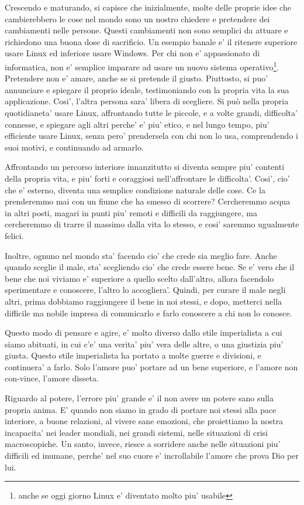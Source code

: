 Crescendo e maturando, si capisce che inizialmente, molte delle proprie idee che cambierebbero le cose nel mondo sono un nostro chiedere e pretendere dei cambiamenti nelle persone. Questi cambiamenti non sono semplici da attuare e richiedono una buona dose di sacrificio. Un esempio banale e' il ritenere superiore usare Linux ed inferiore usare Windows. Per chi non e' appassionato di informatica, non e' semplice imparare ad usare un nuovo sistema operativo\footnote{anche se oggi giorno Linux e' diventato molto piu' usabile}.
Pretendere non e' amare, anche se si pretende il giusto. Piuttosto, si puo' annunciare e spiegare il proprio ideale, testimoniando con la propria vita la sua applicazione. Cosi', l'altra persona sara' libera di scegliere. Si può nella propria quotidianeta' usare Linux, affrontando tutte le piccole, e a volte grandi, difficolta' connesse, e spiegare agli altri perche' e' piu' etico, e nel lungo tempo, piu' efficiente usare Linux, senza pero' prendersela con chi non lo usa, comprendendo i suoi motivi, e continuando ad armarlo.

Affrontando un percorso interiore innanzitutto si diventa sempre piu' contenti della propria vita, e piu' forti e coraggiosi nell'affrontare le difficolta'. Cosi', cio' che e' esterno, diventa una semplice condizione naturale delle cose. Ce la prenderemmo mai con un fiume che ha smesso di scorrere? Cercheremmo acqua in altri posti, magari in punti piu' remoti e difficili da raggiungere, ma cercheremmo di trarre il massimo dalla vita lo stesso, e cosi' saremmo ugualmente felici. 

Inoltre, ognuno nel mondo sta' facendo cio' che crede sia meglio fare. Anche quando sceglie il male, sta' scegliendo cio' che crede essere bene. Se e' vero che il bene che noi viviamo e' superiore a quello scelto dall'altro, allora facendolo sperimentare e conoscere, l'altro lo accogliera'.
Quindi, per curare il male negli altri, prima dobbiamo raggiungere il bene in noi stessi, e dopo, metterci nella difficile ma nobile impresa di comunicarlo e farlo conoscere a chi non lo conosce.

Questo modo di pensare e agire, e' molto diverso dallo stile imperialista a cui siamo abituati, in cui c'e' una verita' piu' vera delle altre, o una giustizia piu' giusta. Questo stile imperialista ha portato a molte guerre e divisioni, e continuera' a farlo. Solo l'amore puo' portare ad un bene superiore, e l'amore non con-vince, l'amore disseta.

Riguardo al potere, l'errore piu' grande e' il non avere un potere sano sulla propria anima. E' quando non siamo in grado di portare noi stessi alla pace interiore, a buone relazioni, al vivere sane emozioni, che proiettiamo la nostra incapacita' nei leader mondiali, nei grandi sistemi, nelle situazioni di crisi macroscopiche. Un santo, invece, riesce a sorridere anche nelle situazioni piu' difficili ed inumane, perche' nel suo cuore e' incrollabile l'amore che prova Dio per lui.

